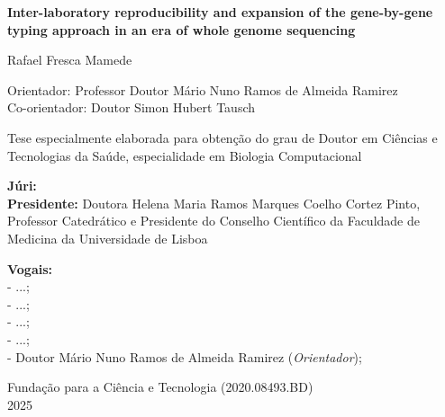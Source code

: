 \begin{titlepage}
\begin{center}
        \vspace{0cm}

        \large
        \textbf{Inter-laboratory reproducibility and expansion of the gene-by-gene typing approach in an era of whole genome sequencing}
        \normalsize
        
        \vspace{0.1cm}
        
        \large
        Rafael Fresca Mamede
        \normalsize
        
        \vspace{0.1cm}
        
        Orientador: Professor Doutor Mário Nuno Ramos de Almeida Ramirez \\
        Co-orientador: Doutor Simon Hubert Tausch
        
        \vspace{0.1cm}
        
        Tese especialmente elaborada para obtenção do grau de Doutor em Ciências e Tecnologias da Saúde, especialidade em Biologia Computacional\\

        \end{center}
        \vspace{0cm}

        \small
        \textbf{Júri:}\\
        \textbf{Presidente:} Doutora Helena Maria Ramos Marques Coelho Cortez Pinto, Professor Catedrático e Presidente do Conselho Científico da Faculdade de Medicina da Universidade de Lisboa

        \textbf{Vogais:} \\
        - ...; \\
        - ...; \\
        - ...; \\
        - ...; \\
        - Doutor Mário Nuno Ramos de Almeida Ramirez (\textit{Orientador}); \\

    \begin{center}
        \normalsize
        Fundação para a Ciência e Tecnologia (2020.08493.BD)\\        
        2025
    \end{center}
\end{titlepage}
